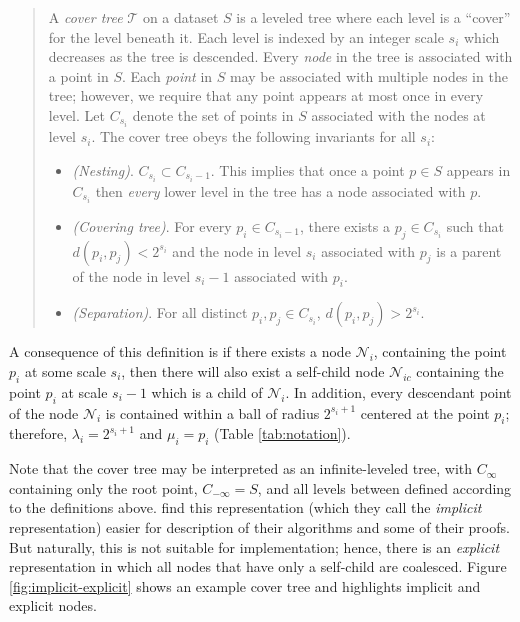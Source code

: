 \begin{quote}
A {\it cover tree} $\mathscr{T}$ on a dataset $S$ is a leveled tree where each
level is a ``cover'' for the level beneath it.  Each level is indexed by an
integer scale $s_i$ which decreases as the tree is descended.  Every {\it node}
in the tree is associated with a point in $S$.  Each {\it point} in $S$ may be
associated with multiple nodes in the tree; however, we require that any point
appears at most once in every level.  Let $C_{s_i}$ denote the set of points in
$S$ associated with the nodes at level $s_i$.  The cover tree obeys the
following invariants for all $s_i$:

\begin{itemize}
  \item {\em (Nesting)}. $C_{s_i} \subset C_{s_i - 1}$.  This implies that once a
point $p \in S$ appears in $C_{s_i}$ then {\it every} lower level in the tree
has a node associated with $p$.

  \item {\em (Covering tree)}. For every $p_i \in C_{s_i - 1}$, there exists a
$p_j \in C_{s_i}$ such that $d(p_i, p_j) < 2^{s_i}$ and the node in level $s_i$
associated with $p_j$ is a parent of the node in level $s_i - 1$ associated with
$p_i$.

  \item {\em (Separation)}.  For all distinct $p_i, p_j \in C_{s_i}$, $d(p_i,
p_j) > 2^{s_i}$.
\end{itemize}
\end{quote}

A consequence of this definition is if there exists a node $\mathscr{N}_i$,
containing the point $p_i$ at some scale $s_i$, then there will also exist a
self-child node $\mathscr{N}_{ic}$ containing the point $p_i$ at scale $s_i - 1$
which is a child of $\mathscr{N}_i$.  In addition, every descendant point of the
node $\mathscr{N}_i$ is contained within a ball of radius $2^{s_i + 1}$ centered
at the point $p_i$; therefore, $\lambda_i = 2^{s_i + 1}$ and $\mu_i = p_i$
(Table \ref{tab:notation}).

Note that the cover tree may be interpreted as an infinite-leveled tree, with
$C_{\infty}$ containing only the root point, $C_{-\infty} = S$, and all levels
between defined according to the definitions above.  \citep{langford2006} find
this representation (which they call the {\it implicit} representation) easier
for description of their algorithms and some of their proofs.  But naturally,
this is not suitable for implementation; hence, there is an {\it explicit}
representation in which all nodes that have only a self-child are coalesced.
Figure \ref{fig:implicit-explicit} shows an example cover tree and highlights
implicit and explicit nodes.

